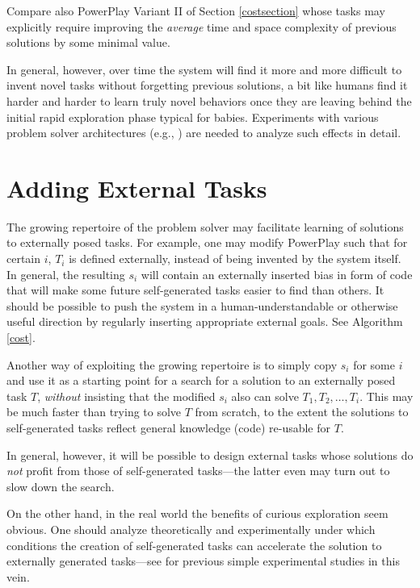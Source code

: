 \documentclass{article}
\begin{document}
Compare also {\sc PowerPlay} Variant II of Section  \ref{costsection}  
whose tasks may explicitly require improving the {\em average}
 time and space complexity of previous solutions by some minimal value.

In general, however, over time the system will find it more and more difficult to invent
novel tasks without forgetting previous solutions, a bit like humans find it harder
and harder to learn truly novel behaviors once they are leaving behind the
initial rapid exploration phase typical for babies.
Experiments with various problem solver architectures (e.g., \cite{rupesh2012icdl,powerplay2012experiments})
 are needed to analyze such effects in detail.




\section{Adding External Tasks}
\label{external}

The growing repertoire of the problem solver  may facilitate learning of solutions to externally posed tasks.
For example, one may modify {\sc PowerPlay} such that for certain $i$, $T_i$ is defined externally,
instead  of being invented by the system itself. In general, the resulting $s_i$ will contain an
externally  inserted bias in
form of code that will make some future self-generated tasks easier to find than others.
It should be possible to push the system in a human-understandable or otherwise useful
direction by regularly inserting appropriate external goals. See Algorithm \ref{cost}.

Another way of exploiting the growing repertoire is to simply copy $s_i$ for some $i$
and use it as a starting point for a search for a solution to an externally posed task $T$, {\em without}
insisting that the modified $s_i$ also can solve $T_1, T_2, \ldots, T_i$. This may be much faster
than trying to solve $T$ from scratch, to the extent the solutions to self-generated
tasks reflect general knowledge (code) re-usable for $T$.

In general, however, it will be possible to design external tasks 
whose solutions do {\em not} profit from those of
self-generated tasks---the latter even may turn out to slow down the search.


On the other hand, in the real world the benefits of curious exploration
seem obvious. One should analyze theoretically and experimentally under which conditions 
the creation of self-generated tasks can accelerate the solution to externally generated
tasks---see \cite{Schmidhuber:91singaporecur,Storck:95,Schmidhuber:99cec,Schmidhuber:02predictable,luciw:icdl2011,cuccu2011,Schaul2011cogp,sunyi2011agi}
for previous simple experimental studies in this vein.
\end{document}
